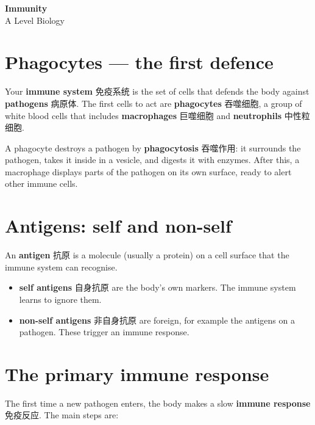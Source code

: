 \documentclass[11pt]{article}
\begin{document}
\begin{center}
  {\LARGE\bfseries Immunity}\\[0.35em]
  {\large A Level Biology}
\end{center}
\vspace{0.6em}

\section*{Phagocytes — the first defence}

Your \textbf{immune system} 免疫系统 is the set of cells that defends the body against \textbf{pathogens} 病原体. The first cells to act are \textbf{phagocytes} 吞噬细胞, a group of white blood cells that includes \textbf{macrophages} 巨噬细胞 and \textbf{neutrophils} 中性粒细胞.

A phagocyte destroys a pathogen by \textbf{phagocytosis} 吞噬作用: it surrounds the pathogen, takes it inside in a vesicle, and digests it with enzymes. After this, a macrophage displays parts of the pathogen on its own surface, ready to alert other immune cells.

\section*{Antigens: self and non-self}

An \textbf{antigen} 抗原 is a molecule (usually a protein) on a cell surface that the immune system can recognise.

\begin{itemize}
\item \textbf{self antigens} 自身抗原 are the body's own markers. The immune system learns to ignore them.

\item \textbf{non-self antigens} 非自身抗原 are foreign, for example the antigens on a pathogen. These trigger an immune response.

\end{itemize}

\section*{The primary immune response}

The first time a new pathogen enters, the body makes a slow \textbf{immune response} 免疫反应. The main steps are:
\end{document}
